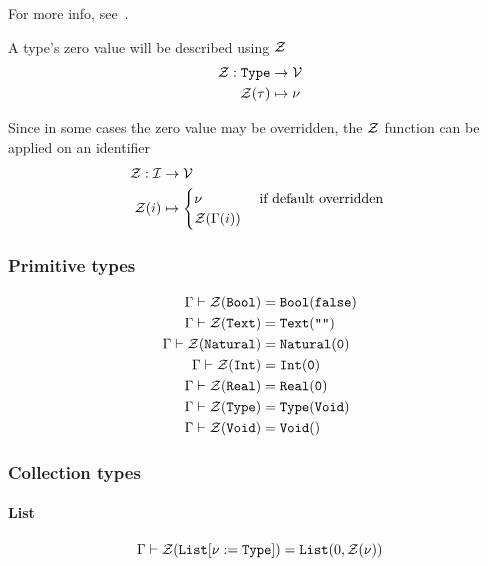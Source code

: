 For more info, see~.

A type's zero value will be described using $\mathcal{Z}$
\[
	\begin{split}
		\mathcal{Z} : \texttt{Type} &\to \mathcal{V} \\*
		\mathcal{Z}(\tau)   &\mapsto \nu
	\end{split}
\]

Since in some cases the zero value may be overridden, the $\mathcal{Z}$ function can
be applied on an identifier
\[
	\begin{split}
		\mathcal{Z} : \mathcal{I} &\to \mathcal{V} \\*
		\mathcal{Z}(i) &\mapsto \begin{cases}
			\nu             &\text{ if default overridden } \\*
			\mathcal{Z}(\Gamma(i)) &
		\end{cases}
	\end{split}
\]

\subsubsection{Primitive types}

\[
	\begin{split}
		\Gamma\vdash \mathcal{Z}(\texttt{Bool})    &= \texttt{Bool}(\texttt{false}) \\*
		\Gamma\vdash \mathcal{Z}(\texttt{Text})    &= \texttt{Text}(\texttt{""}) \\*
		\Gamma\vdash \mathcal{Z}(\texttt{Natural}) &= \texttt{Natural}(\texttt{0}) \\*
		\Gamma\vdash \mathcal{Z}(\texttt{Int})     &= \texttt{Int}(\texttt{0}) \\*
		\Gamma\vdash \mathcal{Z}(\texttt{Real})    &= \texttt{Real}(\texttt{0}) \\*
		\Gamma\vdash \mathcal{Z}(\texttt{Type})    &= \texttt{Type}(\texttt{Void}) \\*
		\Gamma\vdash \mathcal{Z}(\texttt{Void})    &= \texttt{Void}() \\*
	\end{split}
\]

\subsubsection{Collection types}

\paragraph{List}

\[
	\Gamma\vdash \mathcal{Z}(\texttt{List}[\nu:=\texttt{Type}]) = \texttt{List}(0, \mathcal{Z}(\nu))
\]


